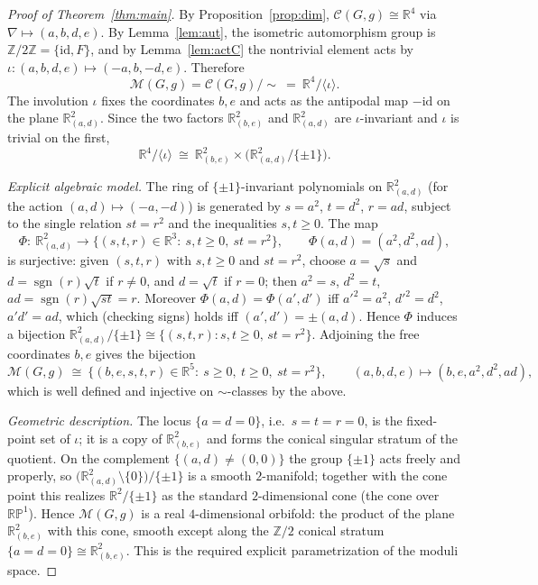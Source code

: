\documentclass{amsart}
\theoremstyle{definition}
\theoremstyle{remark}
\begin{document}
\begin{proof}[Proof of Theorem~\ref{thm:main}]
By Proposition~\ref{prop:dim}, $\mathcal C(G,g)\cong\mathbb R^4$ via $\nabla\mapsto(a,b,d,e)$. By
Lemma~\ref{lem:aut}, the isometric automorphism group is $\mathbb Z/2\mathbb Z=\{\mathrm{id},F\}$, and by
Lemma~\ref{lem:actC} the nontrivial element acts by $\iota:(a,b,d,e)\mapsto(-a,b,-d,e)$. Therefore
\[
\mathcal M(G,g)=\mathcal C(G,g)/\!\sim\ =\ \mathbb R^4/\langle\iota\rangle.
\]
The involution $\iota$ fixes the coordinates $b,e$ and acts as the antipodal map $-\mathrm{id}$ on the plane
$\mathbb R^2_{(a,d)}$. Since the two factors $\mathbb R^2_{(b,e)}$ and $\mathbb R^2_{(a,d)}$ are
$\iota$-invariant and $\iota$ is trivial on the first,
\[
\mathbb R^4/\langle\iota\rangle\ \cong\ \mathbb R^2_{(b,e)}\times\bigl(\mathbb R^2_{(a,d)}/\{\pm 1\}\bigr).
\]

\emph{Explicit algebraic model.} The ring of $\{\pm1\}$-invariant polynomials on $\mathbb R^2_{(a,d)}$ (for the
action $(a,d)\mapsto(-a,-d)$) is generated by $s=a^2$, $t=d^2$, $r=ad$, subject to the single relation $st=r^2$
and the inequalities $s,t\ge0$. The map
\[
\Phi:\ \mathbb R^2_{(a,d)}\longrightarrow\bigl\{(s,t,r)\in\mathbb R^3:\ s,t\ge0,\ st=r^2\bigr\},\qquad
\Phi(a,d)=(a^2,d^2,ad),
\]
is surjective: given $(s,t,r)$ with $s,t\ge0$ and $st=r^2$, choose $a=\sqrt s$ and $d=\operatorname{sgn}(r)\sqrt t$
if $r\neq0$, and $d=\sqrt t$ if $r=0$; then $a^2=s$, $d^2=t$, $ad=\operatorname{sgn}(r)\sqrt{st}=r$. Moreover
$\Phi(a,d)=\Phi(a',d')$ iff $a'^2=a^2$, $d'^2=d^2$, $a'd'=ad$, which (checking signs) holds iff
$(a',d')=\pm(a,d)$. Hence $\Phi$ induces a bijection $\mathbb R^2_{(a,d)}/\{\pm1\}\cong\{(s,t,r):s,t\ge0,\,st=r^2\}$.
Adjoining the free coordinates $b,e$ gives the bijection
\[
\mathcal M(G,g)\ \cong\ \bigl\{(b,e,s,t,r)\in\mathbb R^5:\ s\ge0,\ t\ge0,\ st=r^2\bigr\},\qquad
(a,b,d,e)\mapsto(b,e,a^2,d^2,ad),
\]
which is well defined and injective on $\sim$-classes by the above.

\emph{Geometric description.} The locus $\{a=d=0\}$, i.e.\ $s=t=r=0$, is the fixed-point set of $\iota$; it is a
copy of $\mathbb R^2_{(b,e)}$ and forms the conical singular stratum of the quotient. On the complement
$\{(a,d)\neq(0,0)\}$ the group $\{\pm1\}$ acts freely and properly, so
$\bigl(\mathbb R^2_{(a,d)}\setminus\{0\}\bigr)/\{\pm1\}$ is a smooth $2$-manifold; together with the cone point
this realizes $\mathbb R^2/\{\pm1\}$ as the standard $2$-dimensional cone (the cone over $\mathbb{RP}^1$). Hence
$\mathcal M(G,g)$ is a real $4$-dimensional orbifold: the product of the plane $\mathbb R^2_{(b,e)}$ with this
cone, smooth except along the $\mathbb Z/2$ conical stratum $\{a=d=0\}\cong\mathbb R^2_{(b,e)}$. This is the
required explicit parametrization of the moduli space.
\end{proof}
\end{document}
